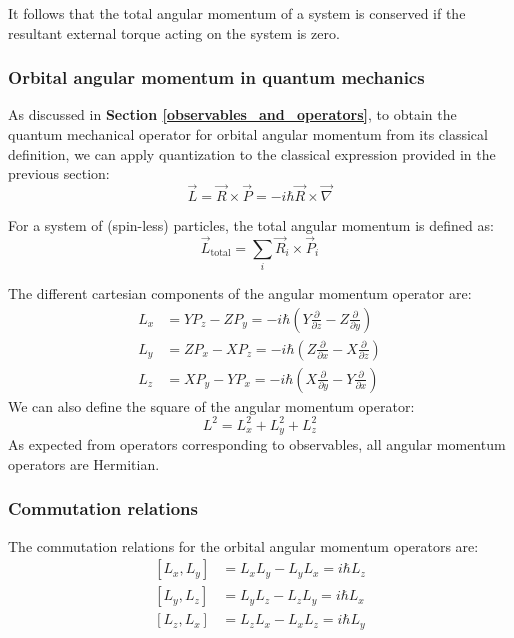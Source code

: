 It follows that the total angular momentum of a system is conserved if the resultant external torque acting on the system is zero.

\subsubsection{Orbital angular momentum in quantum mechanics}

As discussed in \textbf{Section \ref{observables_and_operators}}, to obtain the quantum mechanical operator for orbital angular momentum from its classical definition, we can apply quantization to the classical expression provided in the previous section:
\begin{equation}
    \vec{L} = \vec{R} \times \vec{P} = -i\hbar \vec{R}\times \vec{\nabla}
\end{equation}

For a system of (spin-less) particles, the total angular momentum is defined as:
\begin{equation}
    \vec{L}_\text{total} = \sum_i \vec{R}_i \times \vec{P}_i
\end{equation}

The different cartesian components of the angular momentum operator are:
\begin{equation} \label{orbital_angular_momentum_operators}
    \begin{split}
        L_x &= YP_z - ZP_y = -i\hbar \left(Y\frac{\partial}{\partial z} - Z\frac{\partial}{\partial y}\right) \\
        L_y &= ZP_x - XP_z = -i\hbar \left(Z\frac{\partial}{\partial x} - X\frac{\partial}{\partial z}\right) \\
        L_z &= XP_y - YP_x = -i\hbar \left(X\frac{\partial}{\partial y} - Y\frac{\partial}{\partial x}\right)
    \end{split}
\end{equation}
We can also define the square of the angular momentum operator:
\begin{equation}
    L^2 = L_x^2 + L_y^2 + L_z^2
\end{equation}
As expected from operators corresponding to observables, all angular momentum operators are Hermitian.

\subsubsection{Commutation relations}

The commutation relations for the orbital angular momentum operators are:
\begin{equation}
    \begin{split}
        [L_x, L_y] &= L_xL_y - L_yL_x = i\hbar L_z \\
        [L_y, L_z] &= L_yL_z - L_zL_y = i\hbar L_x \\
        [L_z, L_x] &= L_zL_x - L_xL_z = i\hbar L_y
    \end{split}
\end{equation}

